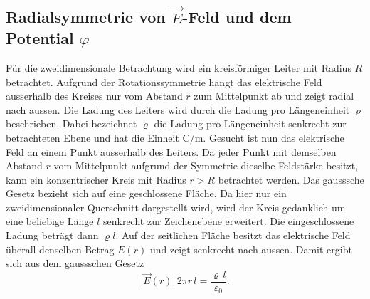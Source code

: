 

\subsection{Radialsymmetrie von $\vec{E}$-Feld und dem Potential $\varphi$
\label{elektro:subsection:Radialsymmetrie}}

Für die zweidimensionale Betrachtung wird ein kreisförmiger Leiter mit Radius $R$ betrachtet.
Aufgrund der Rotationssymmetrie hängt das elektrische Feld ausserhalb des Kreises nur vom Abstand $r$ zum Mittelpunkt ab und zeigt radial nach aussen.
Die Ladung des Leiters wird durch die Ladung pro Längeneinheit $\varrho$ beschrieben.
Dabei bezeichnet $\varrho$ die Ladung pro Längeneinheit senkrecht zur betrachteten Ebene und hat die Einheit $\mathrm{C/m}$.
Gesucht ist nun das elektrische Feld an einem Punkt ausserhalb des Leiters.
Da jeder Punkt mit demselben Abstand $r$ vom Mittelpunkt aufgrund der Symmetrie dieselbe Feldstärke besitzt, kann ein konzentrischer Kreis mit Radius $r>R$ betrachtet werden.
Das gausssche Gesetz bezieht sich auf eine geschlossene Fläche.
%
%
Da hier nur ein zweidimensionaler Querschnitt dargestellt wird, wird der Kreis gedanklich um eine beliebige Länge $l$ senkrecht zur Zeichenebene erweitert.
Die eingeschlossene Ladung beträgt dann $\varrho l$.
Auf der seitlichen Fläche besitzt das elektrische Feld überall denselben Betrag $E(r)$ und zeigt senkrecht nach aussen. Damit ergibt sich aus dem gaussschen Gesetz
\begin{equation*}
    \lvert \vec{E}(r)\rvert \,2\pi r\,l = \frac{\varrho\,l}{\varepsilon_0}.
\end{equation*}

